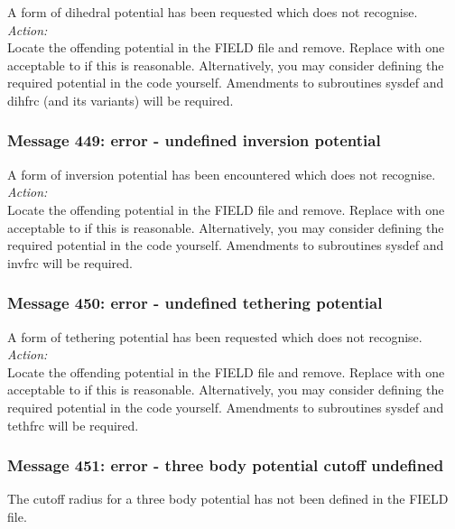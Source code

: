 A form of dihedral potential  has been requested which
\D{} does not recognise.  \\

\noindent
{\em Action:} \\ 
Locate the offending potential in the FIELD file and
remove. Replace with one acceptable to \D{} if this is
reasonable. Alternatively, you may consider defining the required
potential in the code yourself. Amendments to subroutines {\sc sysdef}
and {\sc dihfrc} (and its variants) will be required.

\subsubsection*{Message 449: error - undefined inversion potential}

A form of inversion potential  has been encountered which
\D{} does not recognise.  \\

\noindent
{\em Action:}\\
Locate the offending potential in the FIELD file and
remove. Replace with one acceptable to \D{} if this is
reasonable. Alternatively, you may consider defining the required
potential in the code yourself. Amendments to subroutines {\sc sysdef}
and {\sc invfrc} will be required.

\subsubsection*{Message 450: error - undefined tethering potential}

A form of tethering potential  has been requested which
\D{} does not recognise.  \\

\noindent
{\em Action:} \\ 
Locate the offending potential in the FIELD file and
remove. Replace with one acceptable to \D{} if this is
reasonable. Alternatively, you may consider defining the required
potential in the code yourself. Amendments to subroutines {\sc sysdef}
and {\sc tethfrc} will be required.

\subsubsection*{Message 451: error - three body potential cutoff undefined}

The cutoff radius for a three body potential  has not been defined in
the FIELD file.\\

